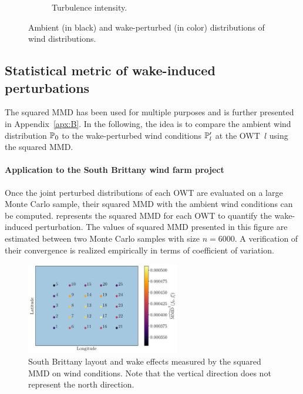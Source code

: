 \begin{figure}
\begin{subfigure}[b]{0.48\textwidth}
        \caption{Turbulence intensity.}
        \label{fig:FIGMarginalTI}
    \end{subfigure}
    \caption{Ambient (in black) and wake-perturbed (in color) distributions of wind distributions.}
\end{figure}





\subsection{Statistical metric of wake-induced perturbations}\label{sec:metric}
The squared MMD has been used for multiple purposes and is further presented in Appendix~\ref{apx:B}. 
In the following, the idea is to compare the ambient wind distribution $\P_0$ to the wake-perturbed wind conditions $\P_l'$ at the OWT~$l$ using the squared MMD.

\paragraph{Application to the South Brittany wind farm project}
Once the joint perturbed distributions of each OWT are evaluated on a large Monte Carlo sample, their squared MMD with the ambient wind conditions can be computed. 
 represents the squared MMD for each OWT to quantify the wake-induced perturbation. 
The values of squared MMD presented in this figure are estimated between two Monte Carlo samples with size $n=6000$. 
A verification of their convergence is realized empirically in terms of coefficient of variation. 

\begin{figure}
    \centering
    \includegraphics[width=0.6\textwidth]{part2/figures/WAKE/wake_perturbation_SB.png}
    \caption{South Brittany layout and wake effects measured by the squared MMD on wind conditions. 
    Note that the vertical direction does not represent the north direction.}
    \label{fig:FIGWakeEffect}
\end{figure}

